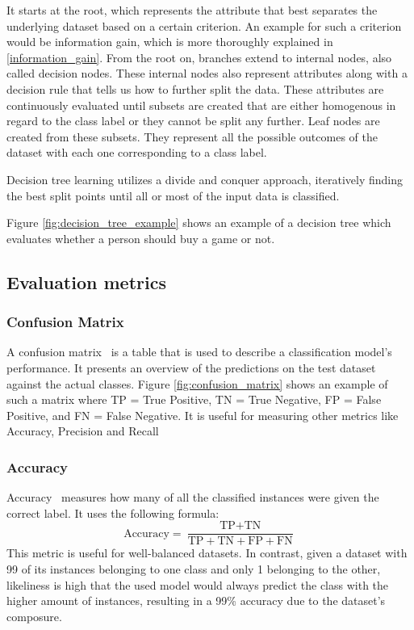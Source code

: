 It starts at the root, which represents the attribute that best separates the underlying dataset based on a certain criterion. An example for such a criterion would be information gain, which is more thoroughly explained in \ref{information_gain}. From the root on, branches extend to internal nodes, also called decision nodes. These internal nodes also represent attributes along with a decision rule that tells us how to further split the data. These attributes are continuously evaluated until subsets are created that are either homogenous in regard to the class label or they cannot be split any further. Leaf nodes are created from these subsets. They represent all the possible outcomes of the dataset with each one corresponding to a class label.

Decision tree learning utilizes a divide and conquer approach, iteratively finding the best split points until all or most of the input data is classified.

Figure \ref{fig:decision_tree_example} shows an example of a decision tree which evaluates whether a person should buy a game or not.

\subsection{Evaluation metrics}

\subsubsection{Confusion Matrix}
A confusion matrix~\cite{evaluation_metrics} is a table that is used to describe a classification model's performance. It presents an overview of the predictions on the test dataset against the actual classes. Figure \ref{fig:confusion_matrix} shows an example of such a matrix where TP = True Positive, TN = True Negative, FP = False Positive, and FN = False Negative.
It is useful for measuring other metrics like Accuracy, Precision and Recall

\subsubsection{Accuracy}
Accuracy~\cite{evaluation_metrics} measures how many of all the classified instances were given the correct label.
It uses the following formula:
\[ \text{Accuracy} = \frac{\text{TP} + \text{TN}}{\text{TP} + \text{TN} + \text{FP} + \text{FN}} \]
This metric is useful for well-balanced datasets. In contrast, given a dataset with 99 of its instances belonging to one class and only 1 belonging to the other, likeliness is high that the used model would always predict the class with the higher amount of instances, resulting in a 99\% accuracy due to the dataset's composure.

